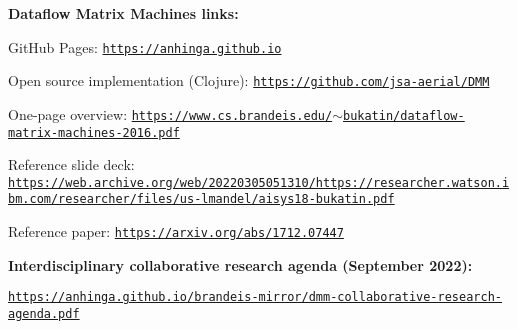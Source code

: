 \documentclass{article}
\begin{document}
\vspace{0.2in}
\noindent
{\bf Dataflow Matrix Machines links:}

\vspace{0.1in}
GitHub Pages: \href{https://anhinga.github.io/}{\tt https://anhinga.github.io}

\vspace{0.1in}
Open source implementation (Clojure): \href{https://github.com/jsa-aerial/DMM}{\tt https://github.com/jsa-aerial/DMM}

\vspace{0.1in}
One-page overview: \href{https://www.cs.brandeis.edu/~bukatin/dataflow-matrix-machines-2016.pdf}{\tt https://www.cs.brandeis.edu/$\sim$bukatin/dataflow-matrix-machines-2016.pdf}

\vspace{0.1in}
Reference slide deck: \href{https://web.archive.org/web/20220305051310/https://researcher.watson.ibm.com/researcher/files/us-lmandel/aisys18-bukatin.pdf}{\tiny\tt https://web.archive.org/web/20220305051310/https://researcher.watson.ibm.com/researcher/files/us-lmandel/aisys18-bukatin.pdf}

\vspace{0.1in}
Reference paper: \href{https://arxiv.org/abs/1712.07447}{\tt https://arxiv.org/abs/1712.07447}

\vspace{0.3in}
\noindent
{\bf Interdisciplinary collaborative research agenda (September 2022):}

\vspace{0.1in}
\href{https://anhinga.github.io/brandeis-mirror/dmm-collaborative-research-agenda.pdf}{\tt https://anhinga.github.io/brandeis-mirror/dmm-collaborative-research-agenda.pdf}
\end{document}
